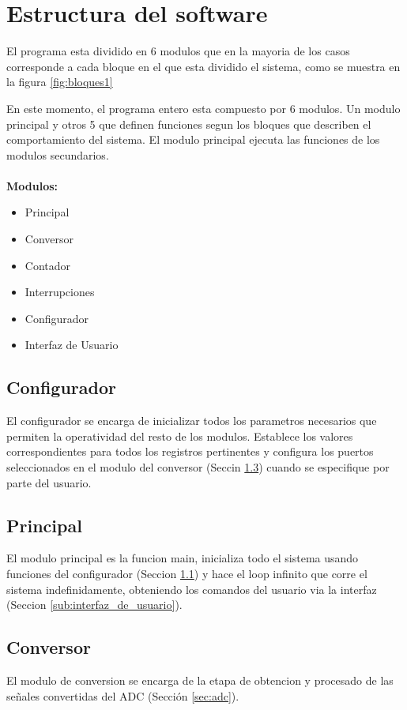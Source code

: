 
\section{Estructura del software} %
\label{sec:estructura_del_software}

El programa esta dividido en 6 modulos que en la mayoria de los casos corresponde a cada bloque en el que esta dividido el sistema, como se muestra en la figura \ref{fig:bloques1}

En este momento, el programa entero esta compuesto por 6 modulos. Un modulo principal y otros 5 que definen funciones segun los bloques que describen el comportamiento del sistema. El modulo principal ejecuta las funciones de los modulos secundarios.

\paragraph{}
\textbf{Modulos:}
\begin{itemize}
  \item Principal
  \item Conversor
  \item Contador
  \item Interrupciones
  \item Configurador
  \item Interfaz de Usuario
\end{itemize}

\subsection{Configurador}\label{sec:configuradorsw}
El configurador se encarga de inicializar todos los parametros necesarios que permiten la operatividad del resto de los modulos. Establece los valores correspondientes para todos los registros pertinentes y configura los puertos seleccionados en el modulo del conversor (Seccin \ref{sec:conversorsw}) cuando se especifique por parte del usuario.
\subsection{Principal}
El modulo principal es la funcion main, inicializa todo el sistema usando funciones del configurador (Seccion \ref{sec:configuradorsw}) y hace el loop infinito que corre el sistema indefinidamente, obteniendo los comandos del usuario via la interfaz (Seccion \ref{sub:interfaz_de_usuario}).

\subsection{Conversor}\label{sec:conversorsw}
El modulo de conversion se encarga de la etapa de obtencion y procesado de las se\~nales convertidas del ADC (Secci\'on \ref{sec:adc}).

